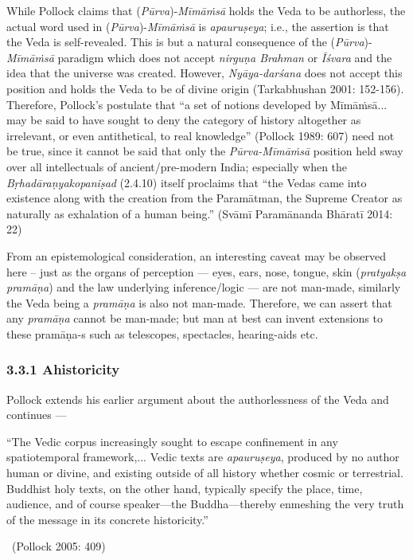 While Pollock claims that (\textit{Pūrva})-\textit{Mīmāṁsā} holds the Veda to be authorless, the actual word used in (\textit{Pūrva})-\textit{Mīmāṁsā} is \textit{apauruṣeya}; i.e., the assertion is that the Veda is self-revealed. This is but a natural consequence of the (\textit{Pūrva})-\textit{Mīmāṁsā} paradigm which does not accept \textit{nirguṇa Brahman} or \textit{Īśvara} and the idea that the universe was created. However, \textit{Nyāya-darśana} does not accept this position and holds the Veda to be of divine origin (Tarkabhushan 2001: 152-156). Therefore, Pollock’s postulate that “a set of notions developed by Mīmāṁsā... may be said to have sought to deny the category of history altogether as irrelevant, or even antithetical, to real knowledge” (Pollock 1989: 607) need not be true, since it cannot be said that only the \textit{Pūrva-Mīmāṁsā} position held sway over all intellectuals of ancient/pre-modern India; especially when the \textit{Bṛhadāraṇyakopaniṣad} (2.4.10) itself proclaims that “the Vedas came into existence along with the creation from the Paramātman, the Supreme Creator as naturally as exhalation of a human being.” (Svāmī Paramānanda Bhāratī 2014: 22)

From an epistemological consideration, an interesting caveat may be observed here – just as the organs of perception — eyes, ears, nose, tongue, skin (\textit{pratyakṣa pramāṇa}) and the law underlying inference/logic — are not man-made, similarly the Veda being a \textit{pramāṇa} is also not man-made. Therefore, we can assert that any \textit{pramāṇa} cannot be man-made; but man at best can invent extensions to these pramāṇa-s such as telescopes, spectacles, hearing-aids etc.

\vspace{-.3cm}

\subsubsection*{3.3.1 Ahistoricity}

Pollock extends his earlier argument about the authorlessness of the Veda and continues —

\begin{myquote}
“The Vedic corpus increasingly sought to escape confinement in any spatiotemporal framework,... Vedic texts are \textit{apauruṣeya}, produced by no author human or divine, and existing outside of all history whether cosmic or terrestrial. Buddhist holy texts, on the other hand, typically specify the place, time, audience, and of course speaker—the Buddha—thereby enmeshing the very truth of the message in its concrete historicity.” 

~\hfill (Pollock 2005: 409)
\end{myquote}

